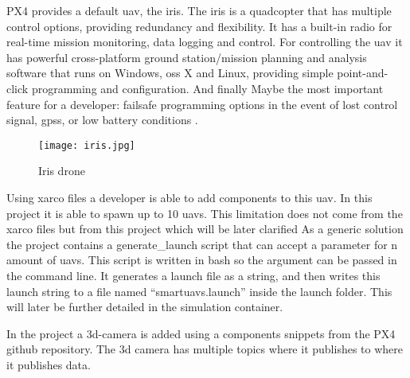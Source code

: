 PX4 provides a default \acs{uav}, the iris. 
The iris is a quadcopter that has multiple control options, providing redundancy and flexibility. 
It has a built-in radio for real-time mission monitoring, data logging and control. 
For controlling the \acs{uav} it has powerful cross-platform ground station/mission planning and 
analysis software that runs on Windows, \acp{os} X and Linux, providing simple point-and-click programming 
and configuration. And finally Maybe the most important feature for a developer: failsafe programming 
options in the event of lost control signal, \acp{gps}, or low battery conditions \cite{arducopter:iris}.

\begin{figure}[ht]
    \centering
    \texttt{[image: iris.jpg]}
    \caption[Iris drone]{Iris drone}
\end{figure}

Using xarco files a developer is able to add components to this \acs{uav}. 
In this project it is able to spawn up to 10 \acp{uav}. This limitation does not come from the xarco files
but from this project which will be later clarified
As a generic solution the project contains a generate\_launch script 
that can accept a parameter for n amount of \acp{uav}. 
This script is written in bash so the argument can be passed in the command line. 
It generates a launch file as a string, and then writes this launch string to a file named 
“smartuavs.launch” inside the launch folder. This will later be further detailed in the simulation container.

In the project a \acs{3d}-camera is added using a components snippets from the PX4 github repository. The \acs{3d} camera has 
multiple topics where it publishes to where it publishes data.
